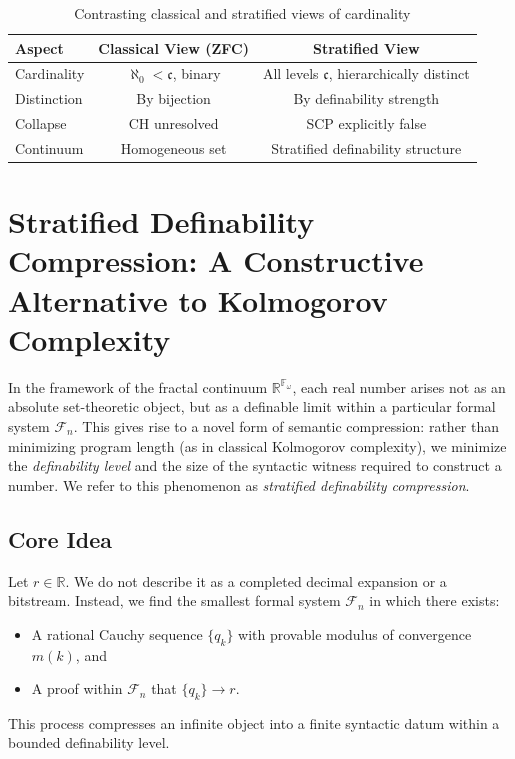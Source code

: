 \documentclass[12pt]{article}
\theoremstyle{definition}
\theoremstyle{plain}
\theoremstyle{remark}
\begin{document}
\begin{table}[ht]
\centering
\renewcommand{\arraystretch}{1.2}
\begin{tabular}{@{}|l|c|c|@{}}
\hline
\textbf{Aspect} & \textbf{Classical View (ZFC)} & \textbf{Stratified View} \\ \hline
Cardinality & \( \aleph_0 < \mathfrak{c} \), binary & All levels \( \mathfrak{c} \), hierarchically distinct \\
Distinction & By bijection & By definability strength \\
Collapse & CH unresolved & SCP explicitly false \\
Continuum & Homogeneous set & Stratified definability structure \\
\hline
\end{tabular}
\caption{Contrasting classical and stratified views of cardinality}
\label{tab:cardinality-reform}
\end{table}

\section{Stratified Definability Compression: A Constructive Alternative to Kolmogorov Complexity}

In the framework of the fractal continuum \( \mathbb{R}^{\mathbb{F}_\omega} \), each real number arises not as an absolute set-theoretic object, but as a definable limit within a particular formal system \( \mathcal{F}_n \). This gives rise to a novel form of semantic compression: rather than minimizing program length (as in classical Kolmogorov complexity), we minimize the \emph{definability level} and the size of the syntactic witness required to construct a number. We refer to this phenomenon as \emph{stratified definability compression}.

\subsection*{Core Idea}

Let \( r \in \mathbb{R} \). We do not describe it as a completed decimal expansion or a bitstream. Instead, we find the smallest formal system \( \mathcal{F}_n \) in which there exists:
\begin{itemize}
    \item A rational Cauchy sequence \( \{ q_k \} \) with provable modulus of convergence \( m(k) \), and
    \item A proof within \( \mathcal{F}_n \) that \( \{ q_k \} \to r \).
\end{itemize}
This process compresses an infinite object into a finite syntactic datum within a bounded definability level.
\end{document}
